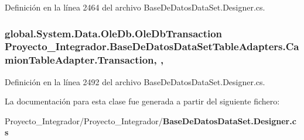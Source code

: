 Definición en la línea 2464 del archivo Base\-De\-Datos\-Data\-Set.\-Designer.\-cs.

\subsubsection[{Transaction}]{\setlength{\rightskip}{0pt plus 5cm}global.\-System.\-Data.\-Ole\-Db.\-Ole\-Db\-Transaction Proyecto\-\_\-\-Integrador.\-Base\-De\-Datos\-Data\-Set\-Table\-Adapters.\-Camion\-Table\-Adapter.\-Transaction\hspace{0.3cm}{\ttfamily [get]}, {\ttfamily [set]}, {\ttfamily [package]}}\label{class_proyecto___integrador_1_1_base_de_datos_data_set_table_adapters_1_1_camion_table_adapter_a72ce6ea2caaaf28d298971830a07111f}


Definición en la línea 2492 del archivo Base\-De\-Datos\-Data\-Set.\-Designer.\-cs.



La documentación para esta clase fue generada a partir del siguiente fichero\-:\begin{DoxyCompactItemize}
\item 
Proyecto\-\_\-\-Integrador/\-Proyecto\-\_\-\-Integrador/{\bf Base\-De\-Datos\-Data\-Set.\-Designer.\-cs}\end{DoxyCompactItemize}
